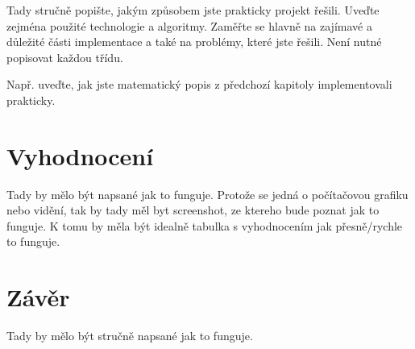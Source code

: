 \documentclass[a4paper, 12pt]{article}
\begin{document}
Tady stručně popište, jakým způsobem jste prakticky projekt řešili. Uveďte zejména použité
technologie a algoritmy. Zaměřte se hlavně na zajímavé a důležité části implementace a také na
problémy, které jste řešili. Není nutné popisovat každou třídu.

Např. uveďte, jak jste matematický popis z předchozí kapitoly implementovali prakticky.



\section{Vyhodnocení}

Tady by mělo být napsané jak to funguje. Protože se jedná o počítačovou grafiku nebo 
vidění, tak by tady měl byt screenshot, ze ktereho bude poznat jak to funguje.
K tomu by měla být idealně tabulka s vyhodnocením jak přesně/rychle to funguje. 


\section{Závěr}

Tady by mělo být stručně napsané jak to funguje.



\begin{flushleft}
  
\end{flushleft}

\end{document}
